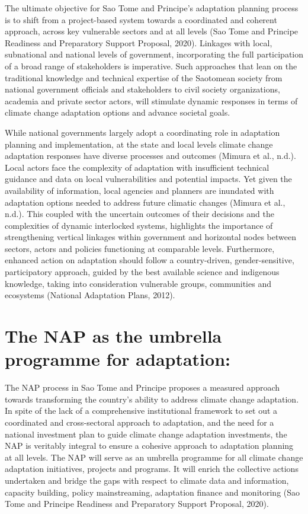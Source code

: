 \documentclass[
]{book}
\begin{document}
The ultimate objective for Sao Tome and Principe's adaptation planning process is to shift from a project-based system towards a coordinated and coherent approach, across key vulnerable sectors and at all levels (Sao Tome and Principe Readiness and Preparatory Support Proposal, 2020). Linkages with local, subnational and national levels of government, incorporating the full participation of a broad range of stakeholders is imperative. Such approaches that lean on the traditional knowledge and technical expertise of the Saotomean society from national government officials and stakeholders to civil society organizations, academia and private sector actors, will stimulate dynamic responses in terms of climate change adaptation options and advance societal goals.

While national governments largely adopt a coordinating role in adaptation planning and implementation, at the state and local levels climate change adaptation responses have diverse processes and outcomes (Mimura et al., n.d.). Local actors face the complexity of adaptation with insufficient technical guidance and data on local vulnerabilities and potential impacts. Yet given the availability of information, local agencies and planners are inundated with adaptation options needed to address future climatic changes (Mimura et al., n.d.). This coupled with the uncertain outcomes of their decisions and the complexities of dynamic interlocked systems, highlights the importance of strengthening vertical linkages within government and horizontal nodes between sectors, actors and policies functioning at comparable levels. Furthermore, enhanced action on adaptation should follow a country-driven, gender-sensitive, participatory approach, guided by the best available science and indigenous knowledge, taking into consideration vulnerable groups, communities and ecosystems (National Adaptation Plans, 2012).

\hypertarget{the-nap-as-the-umbrella-programme-for-adaptation-1}{%
\section{The NAP as the umbrella programme for adaptation:}\label{the-nap-as-the-umbrella-programme-for-adaptation-1}}

The NAP process in Sao Tome and Principe proposes a measured approach towards transforming the country's ability to address climate change adaptation. In spite of the lack of a comprehensive institutional framework to set out a coordinated and cross-sectoral approach to adaptation, and the need for a national investment plan to guide climate change adaptation investments, the NAP is veritably integral to ensure a cohesive approach to adaptation planning at all levels. The NAP will serve as an umbrella programme for all climate change adaptation initiatives, projects and programs. It will enrich the collective actions undertaken and bridge the gaps with respect to climate data and information, capacity building, policy mainstreaming, adaptation finance and monitoring (Sao Tome and Principe Readiness and Preparatory Support Proposal, 2020).
\end{document}
